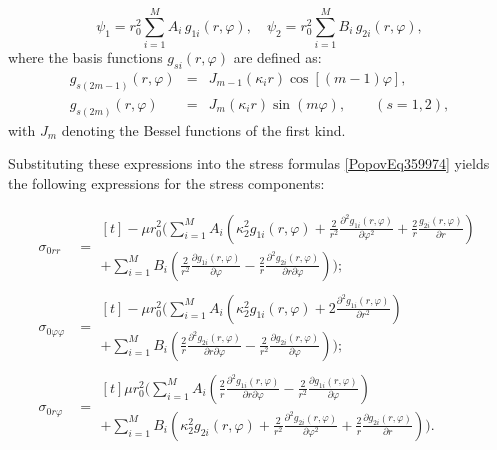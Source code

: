 	\begin{equation} \label{PopovEq299502}
		\psi_1 = r_0^2 \sum_{i=1}^{M} A_i\, g_{1i}(r, \varphi), \quad
		\psi_2 = r_0^2 \sum_{i=1}^{M} B_i\, g_{2i}(r, \varphi),
	\end{equation}
	where the basis functions $g_{si}(r, \varphi)$ are defined as:
	\[
	\begin{array}{rcl}
		g_{s(2m-1)}(r,\varphi) &=& J_{m-1}(\kappa_i r) \cos[(m-1)\varphi], \\
		g_{s(2m)}(r,\varphi) &=& J_m(\kappa_i r) \sin(m\varphi), \qquad (s = 1, 2),
	\end{array}
	\]
	with $J_m$ denoting the Bessel functions of the first kind.
	
	Substituting these expressions into the stress formulas \eqref{PopovEq359974} yields the following expressions for the stress components:
	
	\begin{equation} \label{PopovEq955753} 
		\begin{aligned} \sigma _{0rr} &=
			\begin{multlined}[t]
				-\mu r_{0}^{2} \Bigg(\displaystyle\sum _{i=1}^{M}A_{i} \left(\kappa _{2}^{2} g_{1i} \left(r,\varphi \right)+\frac{2}{r^{2} } \frac{\partial ^{2} g_{1i} \left(r,\varphi \right)}{\partial \varphi ^{2} } +\frac{2}{r} \frac{g_{2i} \left(r,\varphi \right)}{\partial r} \right) 
				\\
				+\displaystyle\sum _{i=1}^{M}B_{i} \left(\frac{2}{r^{2} } \frac{\partial g_{1i} \left(r,\varphi \right)}{\partial \varphi } -\frac{2}{r} \frac{\partial ^{2} g_{2i} \left(r,\varphi \right)}{\partial r\partial \varphi } \right) \Bigg);
			\end{multlined}
			\\
			\sigma _{0\varphi \varphi } &=
			\begin{multlined}[t]
				-\mu r_{0}^{2} \Bigg(\displaystyle\sum _{i=1}^{M}A_{i} \left(\kappa _{2}^{2} g_{1i} \left(r,\varphi \right)+2\frac{\partial ^{2} g_{1i} \left(r,\varphi \right)}{\partial r^{2} } \right) 
				\\
				+\displaystyle\sum _{i=1}^{M}B_{i} \left(\frac{2}{r} \frac{\partial ^{2} g_{2i} \left(r,\varphi \right)}{\partial r\partial \varphi } -\frac{2}{r^{2} } \frac{\partial g_{2i} \left(r,\varphi \right)}{\partial \varphi } \right) \Bigg); 
			\end{multlined}
			\\
			\sigma _{0r\varphi } &=
			\begin{multlined}[t]
				\mu r_{0}^{2} \Bigg(\displaystyle\sum _{i=1}^{M}A_{i} \left(\frac{2}{r} \frac{\partial ^{2} g_{1i} \left(r,\varphi \right)}{\partial r\partial \varphi } -\frac{2}{r^{2} } \frac{\partial g_{1i} \left(r,\varphi \right)}{\partial \varphi } \right)
				\\
				+\displaystyle\sum _{i=1}^{M}B_{i}  \left(\kappa _{2}^{2} g_{2i} \left(r,\varphi \right)+\frac{2}{r^{2} } \frac{\partial ^{2} g_{2i} \left(r,\varphi \right)}{\partial \varphi ^{2} } +\frac{2}{r} \frac{\partial g_{2i} \left(r,\varphi \right)}{\partial r} \right)\Bigg).  
			\end{multlined}
		\end{aligned}
	\end{equation} 
	
